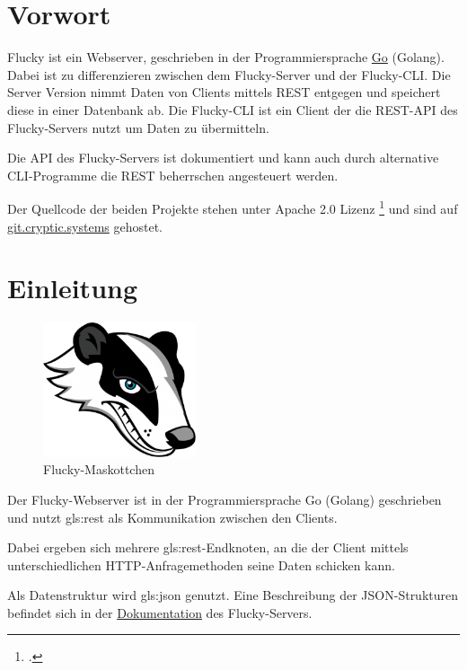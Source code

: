 \section{Vorwort}%
\label{sec:vorwort}

Flucky ist ein Webserver, geschrieben in der Programmiersprache
\href{https://golang.org/}{Go} (Golang). Dabei ist zu differenzieren zwischen
dem Flucky-Server und der Flucky-CLI. Die Server Version nimmt Daten von Clients
mittels REST entgegen und speichert diese in einer Datenbank ab. Die Flucky-CLI
ist ein Client der die REST-API des Flucky-Servers nutzt um Daten zu
übermitteln.

Die API des Flucky-Servers ist dokumentiert und kann auch durch alternative
CLI-Programme die REST beherrschen angesteuert werden.

Der Quellcode der beiden Projekte stehen unter Apache 2.0
Lizenz \footcite{apache-licence} und sind auf
\href{https://git.cryptic.systems}{git.cryptic.systems} gehostet.

\section{Einleitung}%
\label{sec:einleitung}

\begin{figure}
  \includegraphics[width=0.4\textwidth]{img/flucky.png}
  \caption{Flucky-Maskottchen}
\end{figure}

Der Flucky-Webserver ist in der Programmiersprache Go (Golang) geschrieben und
nutzt \Gls{gls:rest} als Kommunikation zwischen den Clients.

Dabei ergeben sich mehrere \Gls{gls:rest}-Endknoten, an die der Client mittels
unterschiedlichen HTTP-Anfragemethoden seine Daten schicken kann.

Als Datenstruktur wird \Gls{gls:json} genutzt. Eine Beschreibung der
JSON-Strukturen befindet sich in der
\href{https://git.cryptic.systems/fh-trier/go-flucky-server/wiki}{Dokumentation}
des Flucky-Servers.

